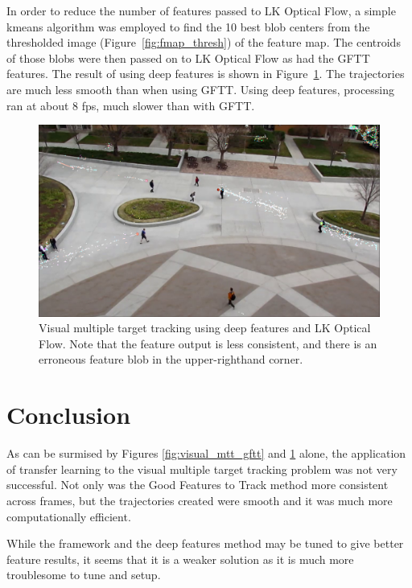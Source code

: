 \documentclass[hidelinks]{article}
\begin{document}
In order to reduce the number of features passed to LK Optical Flow, a simple kmeans algorithm was employed to find the 10 best blob centers from the thresholded image (Figure~\ref{fig:fmap_thresh}) of the feature map. The centroids of those blobs were then passed on to LK Optical Flow as had the GFTT features. The result of using deep features is shown in Figure~\ref{fig:deep_feature_track}. The trajectories are much less smooth than when using GFTT. Using deep features, processing ran at about 8 fps, much slower than with GFTT.

\begin{figure}[H]
  \centering
  \includegraphics[scale=0.27]{deep_feature_track}
  \caption{Visual multiple target tracking using deep features and LK Optical Flow. Note that the feature output is less consistent, and there is an erroneous feature blob in the upper-righthand corner.}
  \label{fig:deep_feature_track}
\end{figure}


\section{Conclusion}
As can be surmised by Figures \ref{fig:visual_mtt_gftt} and \ref{fig:deep_feature_track} alone, the application of transfer learning to the visual multiple target tracking problem was not very successful. Not only was the Good Features to Track method more consistent across frames, but the trajectories created were smooth and it was much more computationally efficient.

While the framework and the deep features method may be tuned to give better feature results, it seems that it is a weaker solution as it is much more troublesome to tune and setup. 
\end{document}
